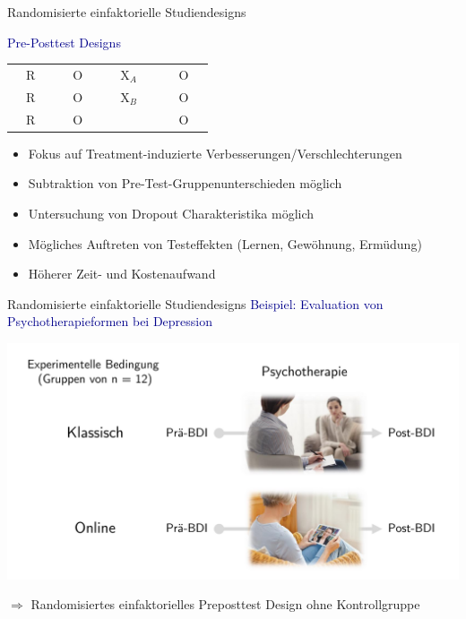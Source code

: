 \documentclass[
  8pt,
  ignorenonframetext,
]{beamer}
\providecommand{\tightlist}{%
  \setlength{\itemsep}{0pt}\setlength{\parskip}{0pt}}
\begin{document}
\begin{frame}{Randomisierte einfaktorielle Studiendesigns}
\protect\hypertarget{randomisierte-einfaktorielle-studiendesigns-5}{}
\large
{}

\textcolor{darkblue}{Pre-Posttest Designs} \vspace{4mm}

\center
\begin{tabular}{|cclc|}
\hline
$\quad$R$\quad$ & $\quad$O$\quad$ & $\quad$X$_A$ $\quad$ & $\quad$O$\quad$
\\
$\quad$R$\quad$ & $\quad$O$\quad$ & $\quad$X$_B$ $\quad$ & $\quad$O$\quad$
\\
$\quad$R$\quad$ & $\quad$O$\quad$ & $\quad$      $\quad$ & $\quad$O$\quad$
\\\hline
\end{tabular}
\vspace{6mm}

\normalsize

\begin{itemize}
\tightlist
\item
  Fokus auf Treatment-induzierte Verbesserungen/Verschlechterungen
\item
  Subtraktion von Pre-Test-Gruppenunterschieden möglich
\item
  Untersuchung von Dropout Charakteristika möglich
\item
  Mögliches Auftreten von Testeffekten (Lernen, Gewöhnung, Ermüdung)
\item
  Höherer Zeit- und Kostenaufwand
\end{itemize}
\end{frame}

\begin{frame}{Randomisierte einfaktorielle Studiendesigns}
\protect\hypertarget{randomisierte-einfaktorielle-studiendesigns-6}{}
\textcolor{darkblue}{Beispiel: Evaluation von Psychotherapieformen bei Depression}
\vspace{2mm}

\begin{center}\includegraphics[width=0.9\linewidth]{8_Abbildungen/alm_8_messplan} \end{center}

\large
\center

\(\Rightarrow\) Randomisiertes einfaktorielles Preposttest Design ohne
Kontrollgruppe
\end{frame}
\end{document}
